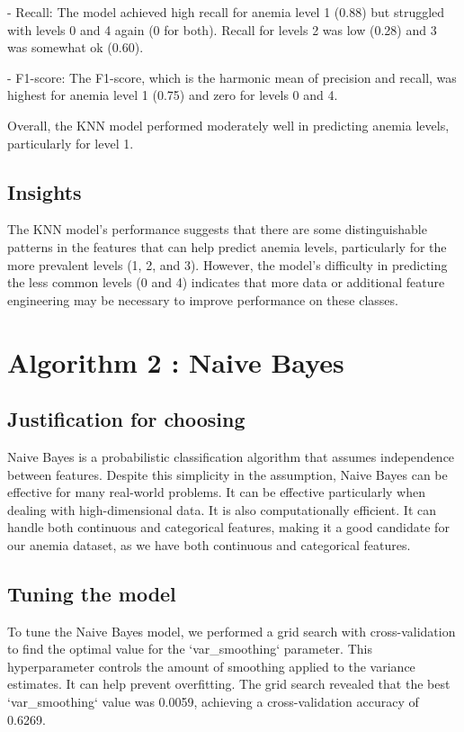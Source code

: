 - Recall: The model achieved high recall for anemia level 1 (0.88) but struggled with levels 0 and 4 again (0 for both). Recall for levels 2 was low (0.28) and 3 was somewhat ok (0.60).


- F1-score: The F1-score, which is the harmonic mean of precision and recall, was highest for anemia level 1 (0.75) and zero for levels 0 and 4.

Overall, the KNN model performed moderately well in predicting anemia levels, particularly for level 1.

\subsection{Insights}

The KNN model's performance suggests that there are some distinguishable patterns in the features that can help predict anemia levels, particularly for the more prevalent levels (1, 2, and 3). However, the model's difficulty in predicting the less common levels (0 and 4) indicates that more data or additional feature engineering may be necessary to improve performance on these classes.

\section{Algorithm 2 : Naive Bayes}

\subsection{Justification for choosing}

Naive Bayes is a probabilistic classification algorithm that assumes independence between features. Despite this simplicity in the assumption, Naive Bayes can be effective for many real-world problems. It can be effective particularly when dealing with high-dimensional data. It is also computationally efficient. It can handle both continuous and categorical features, making it a good candidate for our anemia dataset, as we have both continuous and categorical features.

\subsection{Tuning the model}

To tune the Naive Bayes model, we performed a grid search with cross-validation to find the optimal value for the `var\_smoothing` parameter. This hyperparameter controls the amount of smoothing applied to the variance estimates. It can help prevent overfitting. The grid search revealed that the best `var\_smoothing` value was 0.0059, achieving a cross-validation accuracy of 0.6269.

